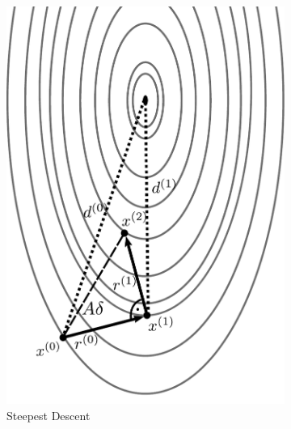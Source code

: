 \begin{figure}
\centering
\begin{subfigure}{.5\textwidth}
  \centering
  \includegraphics[width=0.9\linewidth]{chapters/3_solvers/3_2_iterative_solvers/figures/steepest_descent.pdf}
  \caption{Steepest Descent}
  \label{fig:steepest_descent}
\end{subfigure}%
\begin{subfigure}{.5\textwidth}
  \centering

\end{subfigure}
\end{figure}
